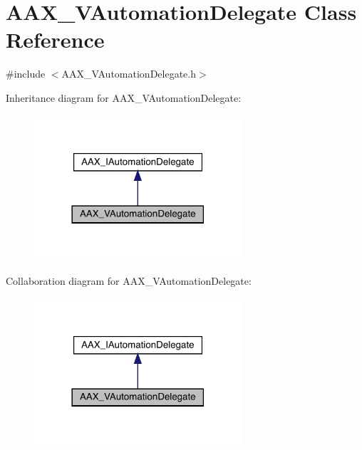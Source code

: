 \hypertarget{a01893}{}\section{A\+A\+X\+\_\+\+V\+Automation\+Delegate Class Reference}
\label{a01893}


{\ttfamily \#include $<$A\+A\+X\+\_\+\+V\+Automation\+Delegate.\+h$>$}



Inheritance diagram for A\+A\+X\+\_\+\+V\+Automation\+Delegate\+:
\nopagebreak
\begin{figure}[H]
\begin{center}
\leavevmode
\includegraphics[width=218pt]{a01892}
\end{center}
\end{figure}


Collaboration diagram for A\+A\+X\+\_\+\+V\+Automation\+Delegate\+:
\nopagebreak
\begin{figure}[H]
\begin{center}
\leavevmode
\includegraphics[width=218pt]{a01891}
\end{center}
\end{figure}


